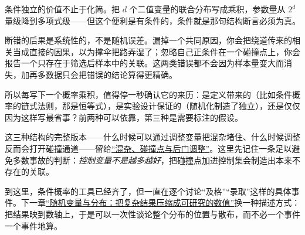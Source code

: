 条件独立的价值不止于化简。把 \(d\) 个二值变量的联合分布写成乘积，参数量从 \(2^d\) 量级降到多项式级——但这个便利是有条件的，条件就是那句结构断言必须为真。

断错的后果是系统性的，不是随机误差。漏掉一个共同原因，你会把绕道传来的相关当成直接的因果，以为撑伞把路弄湿了；忽略自己正条件在一个碰撞点上，你会报告一个只存在于筛选后样本中的关联。这两类错误都不会因为样本量变大而消失，加再多数据只会把错误的结论算得更精确。

所以每写下一个概率乘积，值得停一秒确认它的来历：是定义带来的（比如条件概率的链式法则，那是恒等式），是实验设计保证的（随机化制造了独立），还是仅仅因为这样写最省事？前两种可以依靠，第三种是需要标注的假设。

这三种结构的完整版本——什么时候可以通过调整变量把混杂堵住、什么时候调整反而会打开碰撞通道——留给\hyperref[sec:13-Machine-Learning/12-Causal-Inference/03]{``混杂、碰撞点与后门调整''}。这里先记住一条足以避免多数事故的判断：\emph{控制变量不是越多越好}，把碰撞点加进控制集会制造出本来不存在的关联。

到这里，条件概率的工具已经齐了，但一直在逐个讨论``及格''``录取''这样的具体事件。下一章\hyperref[ch:039]{``随机变量与分布：把复杂结果压缩成可研究的数值''}换一种描述方式：把结果映到数轴上，于是可以一次性谈论整个分布的位置与散布，而不必一个事件一个事件地算。
